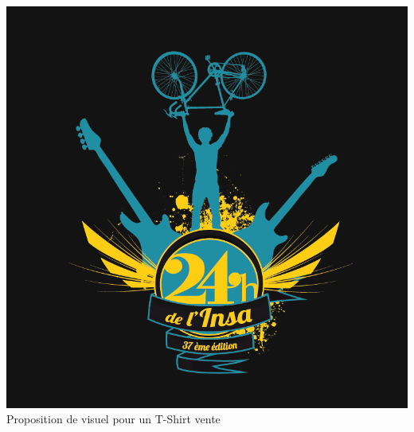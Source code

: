             \begin{center}
                \includegraphics[width=\textwidth]{img/logo-TShirt-bichro.png}
                Proposition de visuel pour un T-Shirt vente
            \end{center}
                
